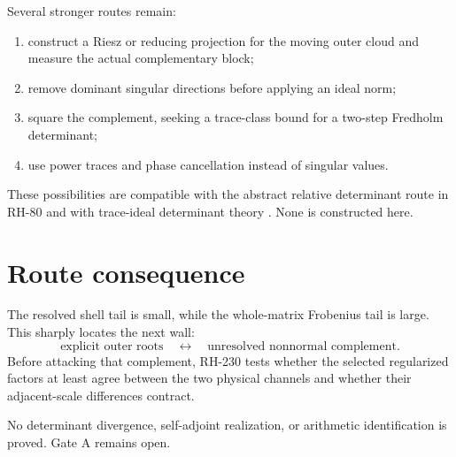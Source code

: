 \documentclass[11pt]{article}
\theoremstyle{remark}\newtheorem{remark}[theorem]{Remark}
\begin{document}
Several stronger routes remain:
\begin{enumerate}[leftmargin=2em]
\item construct a Riesz or reducing projection for the moving outer cloud and
measure the actual complementary block;
\item remove dominant singular directions before applying an ideal norm;
\item square the complement, seeking a trace-class bound for a two-step
Fredholm determinant;
\item use power traces and phase cancellation instead of singular values.
\end{enumerate}

These possibilities are compatible with the abstract relative determinant
route in RH-80 \citep{WangRH80} and with trace-ideal determinant theory
\citep{Simon2005}. None is constructed here.

\section{Route consequence}

The resolved shell tail is small, while the whole-matrix Frobenius tail is
large. This sharply locates the next wall:
\[
 \text{explicit outer roots}
 \quad\longleftrightarrow\quad
 \text{unresolved nonnormal complement}.
\]
Before attacking that complement, RH-230 tests whether the selected
regularized factors at least agree between the two physical channels and
whether their adjacent-scale differences contract.

No determinant divergence, self-adjoint realization, or arithmetic
identification is proved. Gate A remains open.



\end{document}
